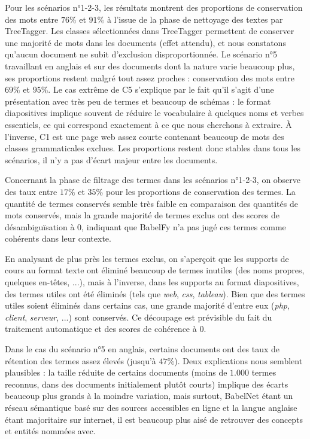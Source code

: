 \bigskip

Pour les scénarios n°1-2-3, les résultats montrent des proportions de conservation des mots entre $ 76 \% $ et $ 91 \% $ à l'issue de la phase de nettoyage des textes par TreeTagger.
Les classes sélectionnées dans TreeTagger permettent de conserver une majorité de mots dans les documents (effet attendu), et nous constatons qu'aucun document ne subit d'exclusion disproportionnée.
Le scénario n°5 travaillant en anglais et sur des documents dont la nature varie beaucoup plus, ses proportions restent malgré tout assez proches : conservation des mots entre $ 69 \% $ et $ 95 \% $.
Le cas extrême de C5 s'explique par le fait qu'il s'agit d'une présentation avec très peu de termes et beaucoup de schémas : le format diapositives implique souvent de réduire le vocabulaire à quelques noms et verbes essentiels, ce qui correspond exactement à ce que nous cherchons à extraire.
À l'inverse, C1 est une page web assez courte contenant beaucoup de mots des classes grammaticales exclues.
Les proportions restent donc stables dans tous les scénarios, il n'y a pas d'écart majeur entre les documents.

\bigskip

Concernant la phase de filtrage des termes dans les scénarios n°1-2-3, on observe des taux entre $ 17 \% $ et $ 35 \% $ pour les proportions de conservation des termes.
La quantité de termes conservés semble très faible en comparaison des quantités de mots conservés, mais la grande majorité de termes exclus ont des scores de désambiguïsation à 0, indiquant que BabelFy n'a pas jugé ces termes comme cohérents dans leur contexte.

\bigskip

En analysant de plus près les termes exclus, on s'aperçoit que les supports de cours au format texte ont éliminé beaucoup de termes inutiles (des noms propres, quelques en-têtes, ...), mais à l'inverse, dans les supports au format diapositives, des termes utiles ont été éliminés (tels que \textit{web}, \textit{css}, \textit{tableau}).
Bien que des termes utiles soient éliminés dans certains cas, une grande majorité d'entre eux (\textit{php}, \textit{client}, \textit{serveur}, ...) sont conservés.
Ce découpage est prévisible du fait du traitement automatique et des scores de cohérence à 0.

\bigskip

Dans le cas du scénario n°5 en anglais, certains documents ont des taux de rétention des termes assez élevés (jusqu'à $ 47 \% $).
Deux explications nous semblent plausibles : la taille réduite de certains documents (moins de $ 1.000 $ termes reconnus, dans des documents initialement plutôt courts) implique des écarts beaucoup plus grands à la moindre variation, mais surtout, BabelNet étant un réseau sémantique basé sur des sources accessibles en ligne et la langue anglaise étant majoritaire sur internet, il est beaucoup plus aisé de retrouver des concepts et entités nommées avec.

